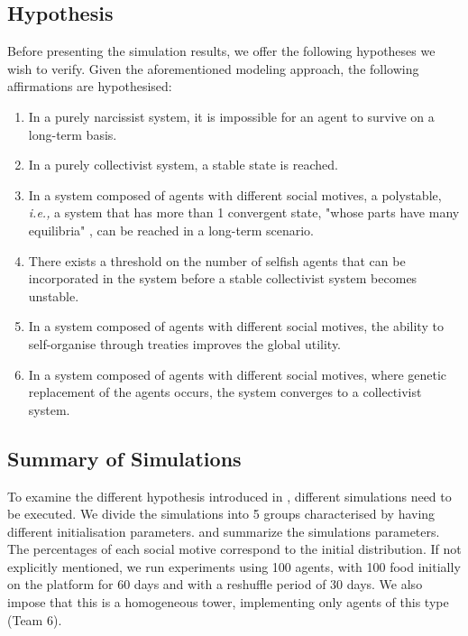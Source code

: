 \subsection{Hypothesis}\label{hypothesis}
Before presenting the simulation results, we offer the following hypotheses we wish to verify. Given the aforementioned modeling approach, the following affirmations are hypothesised:
\begin{enumerate}

    \item In a purely narcissist system, it is impossible for an agent to survive on a long-term basis.
    
    \item In a purely collectivist system, a stable state is reached.
    
    \item In a system composed of agents with different social motives, a polystable, \emph{i.e.,} a system that has more than 1 convergent state, "whose parts have many equilibria" \cite{ashby2015design}, can be reached in a long-term scenario.
        
    \item There exists a threshold on the number of selfish agents that can be incorporated in the system before a stable collectivist system becomes unstable.
     
    \item In a system composed of agents with different social motives, the ability to self-organise through treaties improves the global utility.
    
    \item In a system composed of agents with different social motives, where genetic replacement of the agents occurs, the system converges to a collectivist system.
   
   
\end{enumerate}

\subsection{Summary of Simulations}\label{simulation_summary}

To examine the different hypothesis introduced in , different simulations need to be executed. We divide the simulations into 5 groups characterised by having different initialisation parameters.  and  summarize the simulations parameters. The percentages of each social motive correspond to the initial distribution. If not explicitly mentioned, we run experiments using 100 agents, with 100 food initially on the platform for 60 days and with a reshuffle period of 30 days. We also impose that this is a homogeneous tower, implementing only agents of this type (Team 6).

